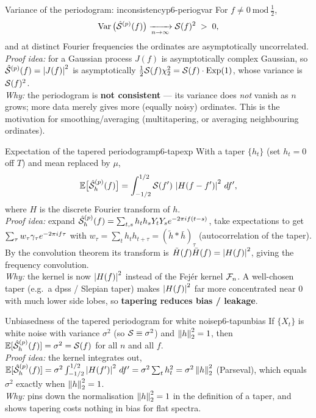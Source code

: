 \begin{theorem}{Variance of the periodogram: inconsistency}{p6-periogvar}
For $f\ne0\ \mathrm{mod}\ \tfrac12$,
\[
\operatorname{Var}\big(\hat{\mathcal{S}}^{(p)}(f)\big)\xrightarrow[n\to\infty]{}\mathcal{S}(f)^2 \;>\;0,
\]
and at distinct Fourier frequencies the ordinates are asymptotically
uncorrelated.\\[2pt]
\textit{Proof idea:} for a Gaussian process $J(f)$ is asymptotically complex
Gaussian, so $\hat{\mathcal{S}}^{(p)}(f)=\left\lvert J(f) \right\rvert^2$ is asymptotically
$\tfrac12\mathcal{S}(f)\chi^2_2=\mathcal{S}(f)\cdot\mathrm{Exp}(1)$, whose variance is
$\mathcal{S}(f)^2$.\\
\textit{Why:} the periodogram is \textbf{not consistent} --- its variance does
\emph{not} vanish as $n$ grows; more data merely gives more (equally noisy)
ordinates. This is the motivation for smoothing/averaging (multitapering,
or averaging neighbouring ordinates).
\end{theorem}

\begin{theorem}{Expectation of the tapered periodogram}{p6-tapexp}
With a taper $\{h_t\}$ (set $h_t=0$ off $T$) and mean replaced by $\mu$,
\[
\mathbb{E}\big[\hat{\mathcal{S}}^{(p)}_h(f)\big]
=\int_{-1/2}^{1/2}\mathcal{S}(f')\,\left\lvert H(f-f') \right\rvert^2\,df',
\]
where $H$ is the discrete Fourier transform of $h$.\\[2pt]
\textit{Proof idea:} expand $\hat{\mathcal{S}}^{(p)}_h(f)=\sum_{t,s}h_th_sY_tY_s
e^{-2\pi i f(t-s)}$, take expectations to get $\sum_\tau w_\tau\gamma_\tau
e^{-2\pi i f\tau}$ with $w_\tau=\sum_t h_th_{t+\tau}=(\tilde h*\bar h)_\tau$
(autocorrelation of the taper). By the convolution theorem its transform is
$\tilde H(f)\bar H(f)=\left\lvert H(f) \right\rvert^2$, giving the frequency convolution.\\
\textit{Why:} the kernel is now $\left\lvert H(f) \right\rvert^2$ instead of the Fej\'er kernel
$\mathcal{F}_n$. A well-chosen taper (e.g.\ a dpss / Slepian taper) makes
$\left\lvert H(f) \right\rvert^2$ far more concentrated near $0$ with much lower side lobes, so
\textbf{tapering reduces bias / leakage}.
\end{theorem}

\begin{corollary}{Unbiasedness of the tapered periodogram for white noise}{p6-tapunbias}
If $\{X_t\}$ is white noise with variance $\sigma^2$ (so $\mathcal{S}\equiv\sigma^2$)
and $\left\lVert h \right\rVert_2^2=1$, then $\mathbb{E}[\hat{\mathcal{S}}^{(p)}_h(f)]=\sigma^2=\mathcal{S}(f)$ for all
$n$ and all $f$.\\[2pt]
\textit{Proof idea:} the kernel integrates out,
$\mathbb{E}[\hat{\mathcal{S}}^{(p)}_h(f)]=\sigma^2\int_{-1/2}^{1/2}\left\lvert H(f') \right\rvert^2\,df'
=\sigma^2\sum_{t}h_t^2=\sigma^2\left\lVert h \right\rVert_2^2$ (Parseval), which equals
$\sigma^2$ exactly when $\left\lVert h \right\rVert_2^2=1$.\\
\textit{Why:} pins down the normalisation $\left\lVert h \right\rVert_2^2=1$ in the definition of
a taper, and shows tapering costs nothing in bias for flat spectra.
\end{corollary}

